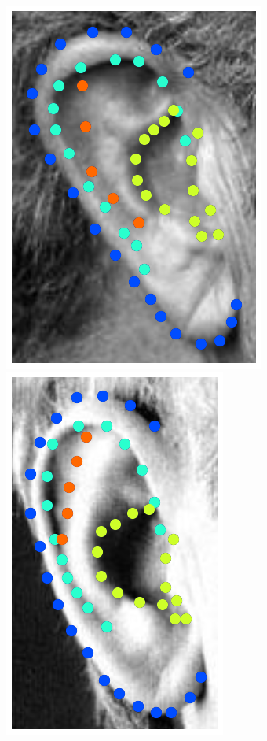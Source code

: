 \begin{figure}
    \includegraphics[height=\flowhhh]{resources/Ear_Deformable_Model/dbs/db_8} 
    \hfill
    \includegraphics[height=\flowhhh]{resources/Ear_Deformable_Model/dbs/db_9}
    \hfill

\end{figure}
